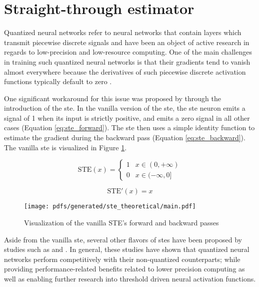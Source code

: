 \section{Straight-through estimator}

\label{section:ste}

Quantized neural networks refer to neural networks that contain
layers which transmit piecewise discrete signals and have been an object of
active research in regards to low-precision and low-resource computing. One of
the main challenges in training such quantized neural networks is
that their gradients tend to vanish almost everywhere because the derivatives of
such piecewise discrete activation functions typically default to zero
\citep{bengio2013estimating,courbariaux2016binarized,yin2019understanding}.

One significant workaround for this issue was proposed by
\citet{bengio2013estimating} through the introduction of the \ac{ste}. In the
vanilla version of the \ac{ste}, the \ac{ste} neuron emits a signal of 1 when its input is
strictly positive, and emits a zero signal in all other cases (Equation
\ref{eq:ste_forward}). The \ac{ste} then uses a simple identity function to estimate
the gradient during the backward pass (Equation \ref{eq:ste_backward}). The
vanilla \ac{ste} is visualized in Figure \ref{fig:ste}.

\begin{equation}
  \label{eq:ste_forward}
  \text{STE}(x)=
  \begin{cases}
    1 & x \in (0, +\infty) \\
    0 & x \in (-\infty, 0]
  \end{cases}
\end{equation}

\begin{equation}
  \label{eq:ste_backward}
  \text{STE}'(x)= x
\end{equation}

\begin{figure}[t]
  \centering
  \texttt{[image: pdfs/generated/ste\_theoretical/main.pdf]}
  \caption{Visualization of the vanilla STE's forward and backward passes}
  \label{fig:ste}
\end{figure}

Aside from the vanilla \ac{ste}, several other flavors of \ac{ste}s have been proposed by
studies such as \citet{courbariaux2016binarized} and
\citet{yin2019understanding}. In general, these studies have shown that
quantized neural networks perform competitively with their
non-quantized counterparts; while providing performance-related benefits related
to lower precision computing as well as enabling further research into threshold
driven neural activation functions.


